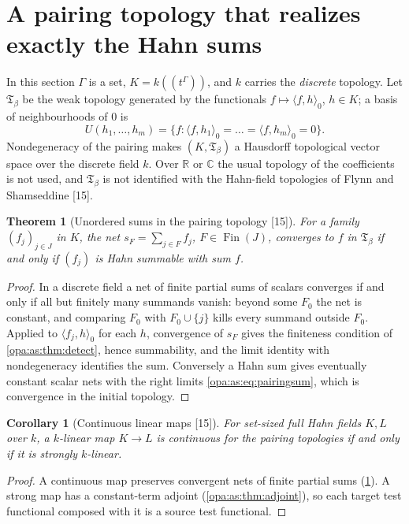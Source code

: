 \documentclass[11pt,oneside]{article}
\numberwithin{equation}{section}
\newtheorem{theorem}{Theorem}[section]
\newtheorem{corollary}[corollary]{Corollary}
\theoremstyle{definition}
\theoremstyle{remark}
\newcommand{\R}{\mathbb R}
\newcommand{\C}{\mathbb C}
\newcommand{\Hahn}[2]{#1((t^{#2}))}
\newcommand{\src}[1]{\textup{\textsf{\small[#1]}}}
\newcommand{\pairing}[2]{\langle #1,#2\rangle_0}
\begin{document}
\section{A pairing topology that realizes exactly the Hahn sums}\label{opa:tc:sec:weak}

In this section $\Gamma$ is a set, $K=\Hahn k\Gamma$, and $k$ carries the \emph{discrete} topology. Let
$\mathfrak T_\beta$ be the weak topology generated by the functionals $f\mapsto\pairing fh$, $h\in K$; a basis of
neighbourhoods of $0$ is
\begin{equation}\label{opa:tc:eq:weak}
 U(h_1,\dots,h_m)=\{f:\pairing f{h_1}=\dots=\pairing f{h_m}=0\}.
\end{equation}
Nondegeneracy of the pairing makes $(K,\mathfrak T_\beta)$ a Hausdorff topological vector space over the discrete
field $k$. Over $\R$ or $\C$ the usual topology of the coefficients is not used, and $\mathfrak T_\beta$ is not
identified with the Hahn-field topologies of Flynn and Shamseddine \cite{FS} \src{15}.

\begin{theorem}[Unordered sums in the pairing topology \src{15}]\label{opa:tc:thm:topologicalsums}
For a family $(f_j)_{j\in J}$ in $K$, the net $s_F=\sum_{j\in F}f_j$, $F\in\operatorname{Fin}(J)$, converges to $f$
in $\mathfrak T_\beta$ if and only if $(f_j)$ is Hahn summable with sum $f$.
\end{theorem}
\begin{proof}
In a discrete field a net of finite partial sums of scalars converges if and only if all but finitely
many summands vanish: beyond some $F_0$ the net is constant, and comparing $F_0$ with $F_0\cup\{j\}$ kills
every summand outside $F_0$. Applied to $\pairing{f_j}h$ for each $h$, convergence of $s_F$ gives the
finiteness condition of \cref{opa:as:thm:detect}, hence summability, and the limit identity with
nondegeneracy identifies the sum. Conversely a Hahn sum gives eventually constant scalar nets with the
right limits \eqref{opa:as:eq:pairingsum}, which is convergence in the initial topology.
\end{proof}

\begin{corollary}[Continuous linear maps \src{15}]\label{opa:tc:cor:continuous}
For set-sized full Hahn fields $K,L$ over $k$, a $k$-linear map $K\to L$ is continuous for the pairing
topologies if and only if it is strongly $k$-linear.
\end{corollary}
\begin{proof}
A continuous map preserves convergent nets of finite partial sums (\cref{opa:tc:thm:topologicalsums}). A
strong map has a constant-term adjoint (\cref{opa:as:thm:adjoint}), so each target test functional composed
with it is a source test functional.
\end{proof}
\end{document}
